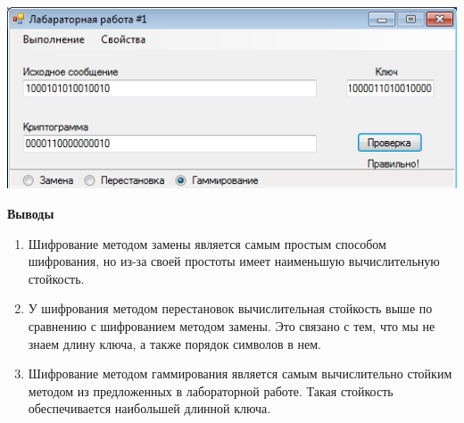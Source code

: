 \documentclass[a4paper,14pt]{extarticle}
\begin{document}
\begin{enumerate}
\begin{center}
            \includegraphics[scale=0.9]{pics/gamm2.png}
        \end{center}
    \end{enumerate}
    

    \textbf{Выводы}
    \begin{enumerate}
        \item Шифрование методом замены является самым простым способом шифрования,
        но из-за своей простоты имеет наименьшую вычислительную стойкость.
        \item У шифрования методом перестановок вычислительная стойкость выше по сравнению
        с шифрованием методом замены. Это связано с тем, что мы не знаем длину ключа, а также
        порядок символов в нем.
        \item Шифрование методом гаммирования является самым вычислительно стойким методом из
        предложенных в лабораторной работе. Такая стойкость обеспечивается наибольшей длинной ключа.
    \end{enumerate}
\end{document}
